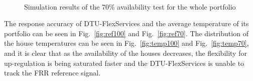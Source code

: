 \begin{figure}[!t]
\centering
{}
\\
\caption{Simulation results of the 70\% availability test for the whole portfolio}
\label{fig:test70}
\end{figure}

The response accuracy of DTU-FlexServices and the average temperature of its portfolio can be seen in Fig.~\ref{fig:ref100} and Fig.~\ref{fig:ref70}. The distribution of the house temperatures can be seen in Fig.~\ref{fig:temp100} and Fig.~\ref{fig:temp70}, and it is clear that as the availability of the houses decreases, the flexibility for up-regulation is being saturated faster and the DTU-FlexServices is unable to track the FRR reference signal.

